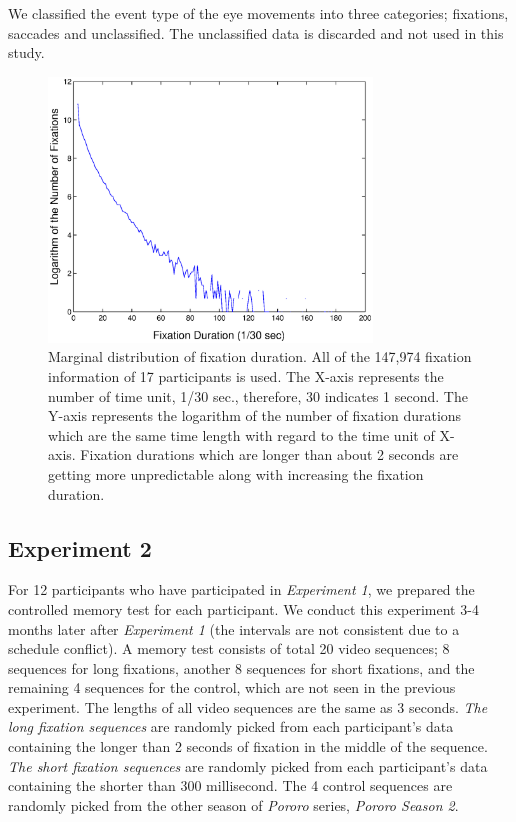 \documentclass[10pt,letterpaper]{article}
\begin{document}
We classified the event type of the eye movements into three categories; fixations, saccades and unclassified. The unclassified data is discarded and not used in this study.

\begin{figure}
  \centerline{\includegraphics[width=86mm,trim=10mm 3mm 10mm 3mm]{./eps/marginal_fixation_duration.eps}}
  \caption{Marginal distribution of fixation duration. All of the 147,974 fixation information of 17 participants is used. The X-axis represents the number of time unit, 1/30 sec., therefore, 30 indicates 1 second. The Y-axis represents the logarithm of the number of fixation durations which are the same time length with regard to the time unit of X-axis. Fixation durations which are longer than about 2 seconds are getting more unpredictable along with increasing the fixation duration.}
  \label{fig:marginal-fixation-duration}
\end{figure}

\subsection{Experiment 2}

For 12 participants who have participated in \textit{Experiment 1}, we prepared the controlled memory test for each participant. We conduct this experiment 3-4 months later after \textit{Experiment 1} (the intervals are not consistent due to a schedule conflict). A memory test consists of total 20 video sequences; 8 sequences for long fixations, another 8 sequences for short fixations, and the remaining 4 sequences for the control, which are not seen in the previous experiment. The lengths of all video sequences are the same as 3 seconds. \textit{The long fixation sequences} are randomly picked from each participant's data containing the longer than 2 seconds of fixation in the middle of the sequence. \textit{The short fixation sequences} are randomly picked from each participant's data containing the shorter than 300 millisecond. The 4 control sequences are randomly picked from the other season of \textit{Pororo} series, \textit{Pororo Season 2}.
\end{document}
